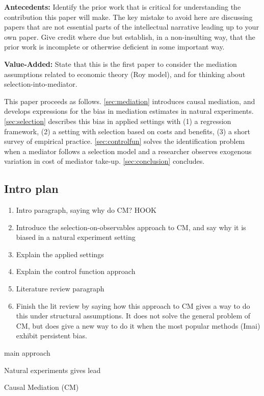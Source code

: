\textbf{Antecedents:}
Identify the prior work that is critical for understanding the contribution this paper will make. The key mistake to avoid here are discussing papers that are not essential parts of the intellectual narrative leading up to your own paper. Give credit where due but establish, in a non-insulting way, that the prior work is incomplete or otherwise deficient in some important way.

\textbf{Value-Added:}
State that this is the first paper to consider the mediation assumptions related to economic theory (Roy model), and for thinking about selection-into-mediator.

This paper proceeds as follows.
\autoref{sec:mediation} introduces causal mediation, and develops expressions for the bias in mediation estimates in natural experiments.
\autoref{sec:selection} describes this bias in applied settings with (1) a regression framework, (2) a setting with selection based on costs and benefits, (3) a short survey of empirical practice.
\autoref{sec:controlfun} solves the identification problem when a mediator follows a selection model and a researcher observes exogenous variation in cost of mediator take-up.
\autoref{sec:conclusion} concludes.


\subsection{Intro plan}

\begin{enumerate}
    \item Intro paragraph, saying why do CM? HOOK
    \item Introduce the selection-on-observables approach to CM, and say why it is biased in a natural experiment setting
    \item Explain the applied settings
    \item Explain the control function approach
    \item Literature review paragraph
    \item Finish the lit review by saying how this approach to CM gives a way to do this under structural assumptions.  It does not solve the general problem of CM, but does give a new way to do it when the most popular methods (Imai) exhibit persistent bias. 
\end{enumerate}

main approach 


Natural experiments gives lead 


Causal Mediation (CM)



